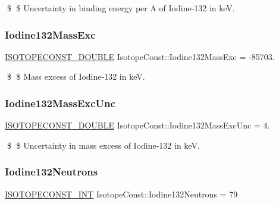 \$ \$ Uncertainty in binding energy per A of Iodine-\/132 in keV. \mbox{\label{group___isotope_const-_iodine-_i132_ga6a6ab88458c7acda3b6a7ca5b474f925}} 
\subsubsection{\texorpdfstring{Iodine132\+Mass\+Exc}{Iodine132MassExc}}
{\footnotesize\ttfamily \mbox{\hyperlink{group___isotope_const-_macros_ga8f45a7272ce02c0b4c65c44636ed719a}{I\+S\+O\+T\+O\+P\+E\+C\+O\+N\+S\+T\+\_\+\+D\+O\+U\+B\+LE}} Isotope\+Const\+::\+Iodine132\+Mass\+Exc = -\/85703.}

\$ \$ Mass excess of Iodine-\/132 in keV. \mbox{\label{group___isotope_const-_iodine-_i132_gaf379f4e6d884f15f8912e9f6806de5f8}} 
\subsubsection{\texorpdfstring{Iodine132\+Mass\+Exc\+Unc}{Iodine132MassExcUnc}}
{\footnotesize\ttfamily \mbox{\hyperlink{group___isotope_const-_macros_ga8f45a7272ce02c0b4c65c44636ed719a}{I\+S\+O\+T\+O\+P\+E\+C\+O\+N\+S\+T\+\_\+\+D\+O\+U\+B\+LE}} Isotope\+Const\+::\+Iodine132\+Mass\+Exc\+Unc = 4.}

\$ \$ Uncertainty in mass excess of Iodine-\/132 in keV. \mbox{\label{group___isotope_const-_iodine-_i132_ga3f8c47a501c929c368d58cb1b609d9fd}} 
\subsubsection{\texorpdfstring{Iodine132\+Neutrons}{Iodine132Neutrons}}
{\footnotesize\ttfamily \mbox{\hyperlink{group___isotope_const-_macros_ga5f18360b3e99483a35c32d789e62621c}{I\+S\+O\+T\+O\+P\+E\+C\+O\+N\+S\+T\+\_\+\+I\+NT}} Isotope\+Const\+::\+Iodine132\+Neutrons = 79}

